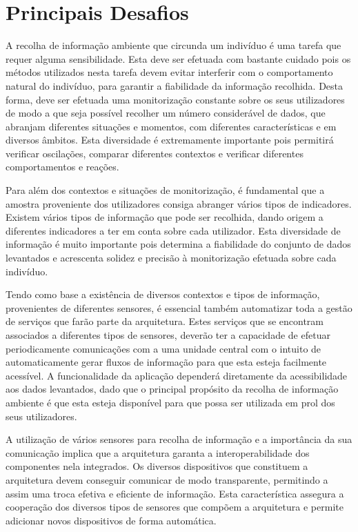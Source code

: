 \section{Principais Desafios}

A recolha de informação ambiente que circunda um indivíduo é uma tarefa que requer alguma sensibilidade. Esta deve ser efetuada com bastante cuidado pois os métodos utilizados nesta tarefa devem evitar interferir com o comportamento natural do indivíduo, para garantir a fiabilidade da informação recolhida. Desta forma, deve ser efetuada uma monitorização constante sobre os seus utilizadores de modo a que seja possível recolher um número considerável de dados, que abranjam diferentes situações e momentos, com diferentes características e em diversos âmbitos. Esta diversidade é extremamente importante pois permitirá verificar oscilações, comparar diferentes contextos e verificar diferentes comportamentos e reações.

Para além dos contextos e situações de monitorização, é fundamental que a amostra proveniente  dos utilizadores consiga abranger vários tipos de indicadores. Existem vários tipos de informação que pode ser recolhida, dando origem a diferentes indicadores a ter em conta sobre cada utilizador. Esta diversidade de informação é muito importante pois determina a fiabilidade do conjunto de dados levantados e acrescenta solidez e precisão à monitorização efetuada sobre cada indivíduo.

Tendo como base a existência de diversos contextos e tipos de informação, provenientes de diferentes sensores, é essencial também automatizar toda a gestão de serviços que farão parte da arquitetura. Estes serviços que se encontram associados a diferentes tipos de sensores, deverão ter a capacidade de efetuar periodicamente comunicações com a uma unidade central com o intuito de automaticamente gerar fluxos de informação para que esta esteja facilmente acessível. A funcionalidade da aplicação dependerá diretamente da acessibilidade aos dados levantados, dado que o principal propósito da recolha de informação ambiente é que esta esteja disponível para que possa ser utilizada em prol dos seus utilizadores.

A utilização de vários sensores para recolha de informação e a importância da sua comunicação implica que a arquitetura garanta a interoperabilidade dos componentes nela integrados. Os diversos dispositivos que constituem a arquitetura devem conseguir comunicar de modo transparente, permitindo a assim uma troca efetiva e eficiente de informação. Esta característica assegura a cooperação dos diversos tipos de sensores que compõem a arquitetura e permite adicionar novos dispositivos de forma automática.

